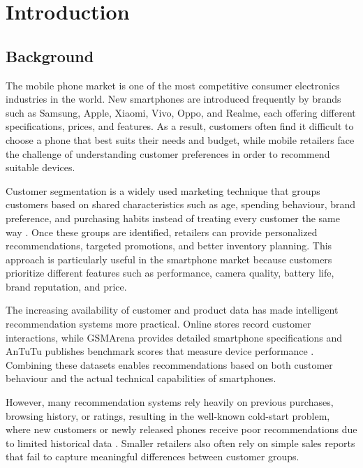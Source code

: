 \documentclass[12pt, a4paper]{report}
\numberwithin{figure}{chapter}
\numberwithin{table}{chapter}
\numberwithin{equation}{chapter}
\begin{document}
\chapter{Introduction}

\section{Background}


The mobile phone market is one of the most competitive consumer electronics industries in the world. New smartphones are introduced
frequently by brands such as Samsung, Apple, Xiaomi, Vivo, Oppo, and Realme, each offering different specifications, prices, and
features. As a result, customers often find it difficult to choose a phone that best suits their needs and budget, while mobile
retailers face the challenge of understanding customer preferences in order to recommend suitable devices.

Customer segmentation is a widely used marketing technique that groups customers based on shared characteristics such as age,
spending behaviour, brand preference, and purchasing habits instead of treating every customer the same way \cite{singh}. Once these
groups are identified, retailers can provide personalized recommendations, targeted promotions, and better inventory planning. This
approach is particularly useful in the smartphone market because customers prioritize different features such as performance, camera
quality, battery life, brand reputation, and price.

The increasing availability of customer and product data has made intelligent recommendation systems more practical. Online stores
record customer interactions, while GSMArena provides detailed smartphone specifications \cite{gsmarena} and AnTuTu publishes
benchmark scores that measure device performance \cite{antutu}. Combining these datasets enables recommendations based on both
customer behaviour and the actual technical capabilities of smartphones.

However, many recommendation systems rely heavily on previous purchases, browsing history, or ratings, resulting in the well-known
cold-start problem, where new customers or newly released phones receive poor recommendations due to limited historical data
\cite{pandey}. Smaller retailers also often rely on simple sales reports that fail to capture meaningful differences between customer
groups.
\end{document}
